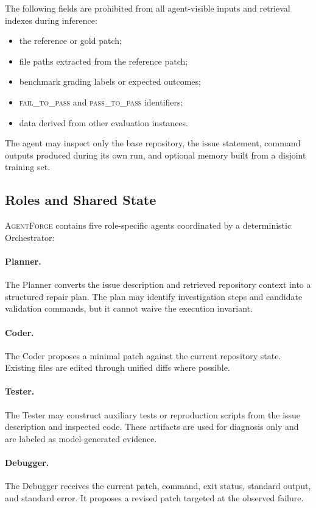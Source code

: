 \documentclass[journal]{IEEEtran}
\newcommand{\agentforge}{\textsc{AgentForge}}
\begin{document}
The following fields are prohibited from all agent-visible inputs and retrieval indexes during inference:
\begin{itemize}
    \item the reference or gold patch;
    \item file paths extracted from the reference patch;
    \item benchmark grading labels or expected outcomes;
    \item \textsc{fail\_to\_pass} and \textsc{pass\_to\_pass} identifiers;
    \item data derived from other evaluation instances.
\end{itemize}
The agent may inspect only the base repository, the issue statement, command outputs produced during its own run, and optional memory built from a disjoint training set.

\subsection{Roles and Shared State}

\agentforge{} contains five role-specific agents coordinated by a deterministic Orchestrator:

\paragraph{Planner.} The Planner converts the issue description and retrieved repository context into a structured repair plan. The plan may identify investigation steps and candidate validation commands, but it cannot waive the execution invariant.

\paragraph{Coder.} The Coder proposes a minimal patch against the current repository state. Existing files are edited through unified diffs where possible.

\paragraph{Tester.} The Tester may construct auxiliary tests or reproduction scripts from the issue description and inspected code. These artifacts are used for diagnosis only and are labeled as model-generated evidence.

\paragraph{Debugger.} The Debugger receives the current patch, command, exit status, standard output, and standard error. It proposes a revised patch targeted at the observed failure.
\end{document}
